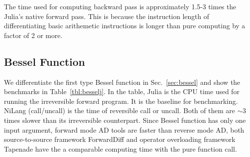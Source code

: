 \documentclass{article}
\newcommand{\<}{\langle}
\renewcommand{\>}{\rangle}
\newcommand{\Tbl}[1]{Table~\ref{#1}}
\newcommand{\Sec}[1]{Sec.~\ref{#1}}
\newcommand{\ra}[1]{\renewcommand{\arraystretch}{#1}}
\theoremstyle{definition}\newtheorem{definition}{\textit{Definition}}
\begin{document}
The time used for computing backward pass is approximately 1.5-3 times the Julia's native forward pass.
This is because the instruction length of differentiating basic arithemetic instructions is longer than pure computing by a factor of 2 or more.


\subsection{Bessel Function}
We differentiate the first type Bessel function in \Sec{sec:bessel} and show the benchmarks in \Tbl{tbl:besselj}.
In the table, Julia is the CPU time used for running the irreversible forward program. It is the baseline for benchmarking.
NiLang (call/uncall) is the time of reversible call or uncall. Both of them are $\sim3$ times slower than its irreversible counterpart. Since Bessel function has only one input argument, forward mode AD tools are faster than reverse mode AD, both source-to-source framework ForwardDiff and operator overloading framework Tapenade have the a comparable computing time with the pure function call.
\begin{table}[h!]\centering
\begin{minipage}{0.8\columnwidth}
\ra{1.3}
    \caption{Time and space used for computing objective (O) and gradient (G) of the first kind Bessel function $J_2(1.0)$.
    The CUDA time is averaged over a batch size of 4000, which is not a fair comparison but shows how much performance can we get from GPU in the parallel computing context.
}\label{tbl:besselj}
\end{minipage}
\end{table}
\end{document}
